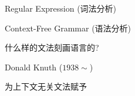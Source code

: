 





\begin{frame}{}
  \begin{center}
    Regular Expression (词法分析)

    \vspace{1.00cm}
    Context-Free Grammar (语法分析)

    \pause
    \vspace{1.00cm}
    {什么样的文法刻画语言的?}
  \end{center}
\end{frame}

\begin{frame}{}

  \begin{center}
    Donald Knuth ($1938 \sim$)
  \end{center}
\end{frame}

\begin{frame}{}

  \begin{center}
     为上下文无关文法赋予
  \end{center}
\end{frame}


